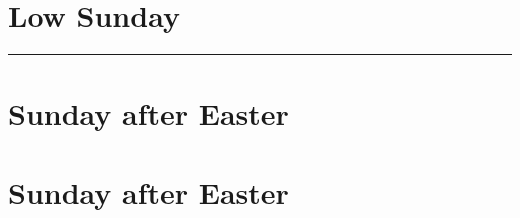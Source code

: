 {{{\begin{centering}
        \end{centering}%
        \vspace{-\baselineskip}
        \printsundaysaftereaster{}
    }
    \newcommand{\prehymn}{\vfil\pagebreak}
    \newcommand{\magreplacement}{\noindent\begin{centering}

        \emph{Magnificat \& Collect of the Sunday.}

        \end{centering}
        \vspace{-\baselineskip}
        \printsundaysaftereaster{}
        \benedicamusdominoreference{easter}
    }
    \newcommand{\collectreplacement}{\bigskip}
    \def\prepsalmtitlefour{\vspace{-0.075\baselineskip}}
    \def\prepsalmfive{\greseteolcustos{manual}}
}

{
\section{Low Sunday}
\label{easter1}
\printcommonvespers[1]

\def\commemorations{If the Feast of the Annunciation has been transferred to the Monday following Low Sunday, \emph{First Vespers} is commemorated as on page \pageref{annunciation-commem}.  If today is April 30, May 1, or May 2, \emph{First Vespers of St Joseph the Worker} is commemorated as follows.}
\printcommemnote{}
}

\medskip
\hrule
{
\label{stjoseph-worker-commem}
\def\begincollectcols{\begin{parcolumns}[rulebetween,colwidths={1=0.43\linewidth}]{2}}
\def\vrlinebreak{T}

\bigskip
\benedicamusdomino{}
}

{
\section{ Sunday after Easter}
\label{easter2}
\printcommonvespers{}
\def\precollect{\printvrmanenobiscum}
\benedicamusdomino{}
}
{
\section{ Sunday after Easter}
\label{easter3}
\printcommonvespers{}
\def\begincollectcols{\begin{parcolumns}[rulebetween,colwidths={1=0.44\linewidth}]{2}}
\def\precollect{\printvrmanenobiscum}
\benedicamusdomino{}
}

}
